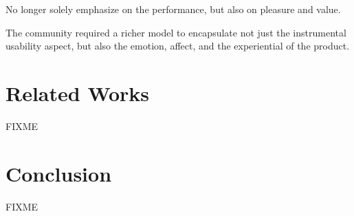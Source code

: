 \documentclass{acm_proc_article-sp}
\begin{document}
No longer solely emphasize on the performance, but also on pleasure
and value.

The community required a richer model to encapsulate not just the
instrumental usability aspect, but also the emotion, affect, and the
experiential of the product.

\section{Related Works}
FIXME

\section{Conclusion}
FIXME



\end{document}
